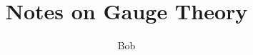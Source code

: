 \documentclass[12pt,a4paper]{article}
\newlength{\tocupshift}
\begin{document}
\title{Notes on Gauge Theory}
\author{Bob}
\date{}
\maketitle
\vspace*{\tocupshift}
\tableofcontents

\newpage

\setcounter{section}{4}  %







% 
% 


% 
\end{document}
